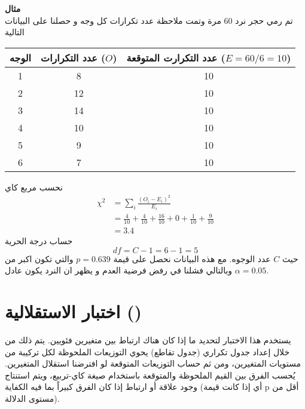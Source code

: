 \noindent
\textbf{مثال}\\
تم رمي حجر نرد 60 مرة وتمت ملاحظة عدد تكرارات كل وجه و حصلنا على البيانات التالية
\begin{table}[H]
	\centering
	\begin{tabular}{|c|c|c|}
		\hline
		الوجه & عدد التكرارات ($O$) & عدد التكرارت المتوقعة ($E=60/6=10$)\\
		\hline
		1 & 8&10 \\
		2 &12&10\\
		3&14&10\\
		4&10&10\\
		5&9&10\\
		6&7&10\\
		\hline
	\end{tabular}
\end{table}
نحسب مربع كاي
\begin{align*}
	\chi^2 &= \sum_i \frac{(O_i - E_i)^2}{E_i} \\
	&= \frac{4}{10} + \frac{4}{10} + \frac{16}{10} + 0 + \frac{1}{10} + \frac{9}{10}\\
	&= 3.4
\end{align*}
حساب درجة الحرية 
\[
df = C -1 = 6-1 = 5
\]
حيث $C$ عدد الوجوه. مع هذه البيانات نحصل على قيمة $p = 0.639$ والتي تكون اكبر من $\alpha = 0.05$ وبالتالي فشلنا في رفض فرضية العدم و يظهر ان النرد يكون عادل.  

\section{اختبار الاستقلالية ()}
يستخدم هذا الاختبار لتحديد ما إذا كان هناك ارتباط بين متغيرين فئويين. يتم ذلك من خلال إعداد جدول تكراري (جدول تقاطع) يحوي التوزيعات الملحوظة لكل تركيبة من مستويات المتغيرين، ومن ثم حساب التوزيعات المتوقعة لو افترضنا استقلال المتغيرين. يُحسب الفرق بين القيم الملحوظة والمتوقعة باستخدام صيغة كاي-تربيع، ويتم استنتاج وجود علاقة أو ارتباط إذا كان الفرق كبيراً بما فيه الكفاية (أي إذا كانت قيمة p أقل من مستوى الدلالة). 

